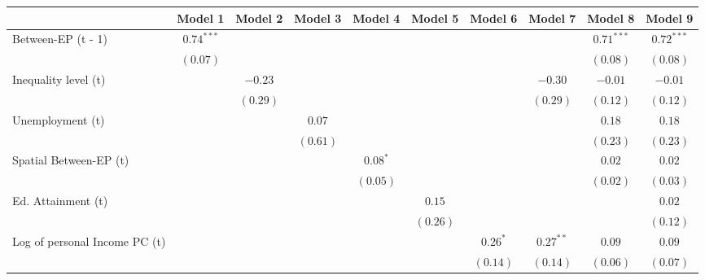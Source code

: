 
\begin{table}
\begin{center}
\begin{tabular}{l c c c c c c c c c}
\hline
 & Model 1 & Model 2 & Model 3 & Model 4 & Model 5 & Model 6 & Model 7 & Model 8 & Model 9 \\
\hline
Between-EP (t - 1)            & $0.74^{***}$ &          &          &            &          &             &             & $0.71^{***}$ & $0.72^{***}$ \\
                              & $(0.07)$     &          &          &            &          &             &             & $(0.08)$     & $(0.08)$     \\
Inequality level (t)          &              & $-0.23$  &          &            &          &             & $-0.30$     & $-0.01$      & $-0.01$      \\
                              &              & $(0.29)$ &          &            &          &             & $(0.29)$    & $(0.12)$     & $(0.12)$     \\
Unemployment (t)              &              &          & $0.07$   &            &          &             &             & $0.18$       & $0.18$       \\
                              &              &          & $(0.61)$ &            &          &             &             & $(0.23)$     & $(0.23)$     \\
Spatial Between-EP (t)        &              &          &          & $0.08^{*}$ &          &             &             & $0.02$       & $0.02$       \\
                              &              &          &          & $(0.05)$   &          &             &             & $(0.02)$     & $(0.03)$     \\
Ed. Attainment (t)            &              &          &          &            & $0.15$   &             &             &              & $0.02$       \\
                              &              &          &          &            & $(0.26)$ &             &             &              & $(0.12)$     \\
Log of personal Income PC (t) &              &          &          &            &          & $0.26^{*}$  & $0.27^{**}$ & $0.09$       & $0.09$       \\
                              &              &          &          &            &          & $(0.14)$    & $(0.14)$    & $(0.06)$     & $(0.07)$     \\

\end{tabular}
\end{center}
\end{table}

